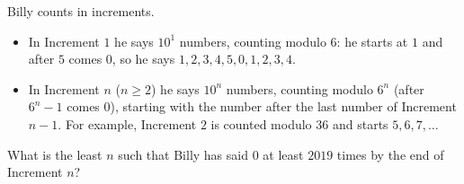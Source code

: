 Billy counts in increments.
\begin{itemize}
\item In Increment $1$ he says $10^1$ numbers, counting modulo $6$: he starts at $1$ and after $5$ comes $0$, so he says $1,2,3,4,5,0,1,2,3,4$.
\item In Increment $n$ ($n\ge2$) he says $10^n$ numbers, counting modulo $6^n$ (after $6^n-1$ comes $0$), starting with the number after the last number of Increment $n-1$. For example, Increment $2$ is counted modulo $36$ and starts $5,6,7,\dots$
\end{itemize}
What is the least $n$ such that Billy has said $0$ at least $2019$ times by the end of Increment $n$?
